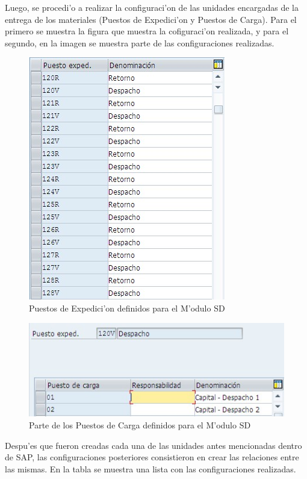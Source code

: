 	Luego, se procedi'o a realizar la configuraci'on de las unidades encargadas de la entrega de los materiales (Puestos de Expedici'on y Puestos de Carga). Para el primero se muestra la figura que muestra la cofiguraci'on realizada, y para el segundo, en la imagen se muestra parte de las configuraciones realizadas.
\begin{figure}[htb]
\centering
\includegraphics[scale=0.65,type=jpg,ext=.jpg,read=.jpg]{figures/PuestosExpedicion}
\caption{Puestos de Expedici'on definidos para el M'odulo SD}
\label{fig:expedicion}
\end{figure}
\begin{figure}[htb]
\centering
\includegraphics[scale=0.65,type=jpg,ext=.jpg,read=.jpg]{figures/PuestoCarga}
\caption{Parte de los Puestos de Carga definidos para el M'odulo SD}
\label{fig:carga}
\end{figure}
Despu'es que fueron creadas cada una de las unidades antes mencionadas dentro de SAP, las configuraciones posteriores consistieron en crear las relaciones entre las mismas. En la tabla se muestra una lista con las configuraciones realizadas.

